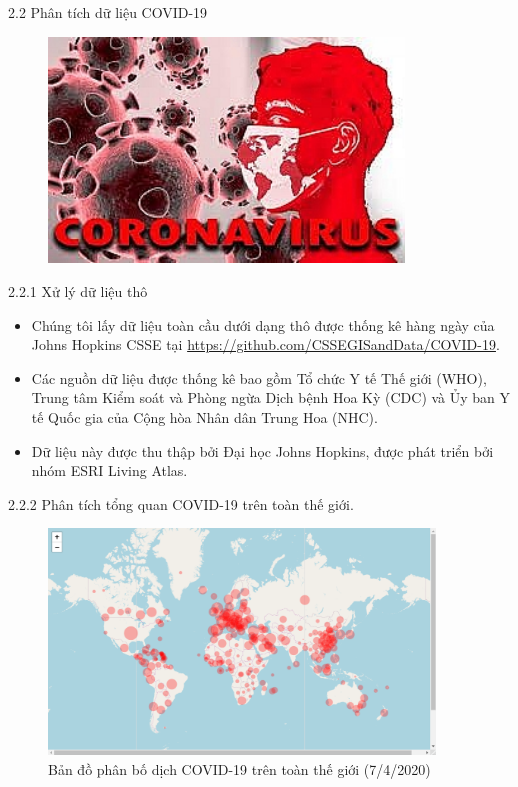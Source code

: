 \documentclass[notheorems,envcountsect,hyperref=unicode]{beamer}
\begin{document}
\begin{frame}{2.2 Phân tích dữ liệu COVID-19}
	\begin{figure}[!h]
		\centering
		\includegraphics[width=1\linewidth,height=6cm]{covid19}  
		\vskip-4mm
	\end{figure}
\end{frame}

\begin{frame}{2.2.1 Xử lý dữ liệu thô}
\begin{itemize}
\item Chúng tôi lấy dữ liệu toàn cầu dưới dạng thô được thống kê hàng ngày của Johns Hopkins CSSE tại \url{https://github.com/CSSEGISandData/COVID-19}.
\item Các nguồn dữ liệu được thống kê bao gồm Tổ chức Y tế Thế giới (WHO), Trung tâm Kiểm soát và Phòng ngừa Dịch bệnh Hoa Kỳ (CDC) và Ủy ban Y tế Quốc gia của Cộng hòa Nhân dân Trung Hoa (NHC).
\item Dữ liệu này được thu thập bởi Đại học Johns Hopkins, được phát triển bởi nhóm ESRI Living Atlas.
\end{itemize}
\end{frame}

\begin{frame}{2.2.2 Phân tích tổng quan COVID-19 trên toàn thế giới.}
\begin{figure}[!htb]
	\centering
	\includegraphics[width=1\linewidth,height=6cm]{Rplot}  
	\caption{Bản đồ phân bố dịch COVID-19 trên toàn thế giới (7/4/2020)}
\end{figure}
\end{frame}
\end{document}
